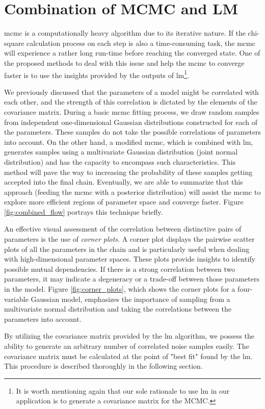 \documentclass[12pt, TexShade, letterpaper]{report}
\begin{document}
\section{Combination of MCMC and LM}
\gls{mcmc} is a computationally heavy algorithm due to its iterative nature. If the chi-square calculation process on each step is also a time-consuming task, the \gls{mcmc} will experience a rather long run-time before reaching the converged state. One of the proposed methods to deal with this issue and help the \gls{mcmc} to converge faster is to use the insights provided by the outputs of \gls{lm}\footnote{It is worth mentioning again that our sole rationale to use \gls{lm} in our application is to generate a covariance matrix for the MCMC.}.\par
We previously discussed that the parameters of a model might be correlated with each other, and the strength of this correlation is dictated by the elements of the covariance matrix. During a basic \gls{mcmc} fitting process, we draw random samples from independent one-dimensional Gaussian distributions constructed for each of the parameters. These samples do not take the possible correlations of parameters into account. On the other hand, a modified \gls{mcmc}, which is combined with \gls{lm}, generates samples using a multivariate Gaussian distribution (joint normal distribution) and has the capacity to encompass such characteristics. This method will pave the way to increasing the probability of these samples getting accepted into the final chain. Eventually, we are able to summarize that this approach (feeding the \gls{mcmc} with a posterior distribution) will assist the \gls{mcmc} to explore more efficient regions of parameter space and converge faster. Figure \ref{fig:combined_flow} portrays this technique briefly.\par
An effective visual assessment of the correlation between distinctive pairs of parameters is the use of \emph{corner plots}. A corner plot displays the pairwise scatter plots of all the parameters in the chain and is particularly useful when dealing with high-dimensional parameter spaces. These plots provide insights to identify possible mutual dependencies. If there is a strong correlation between two parameters, it may indicate a degeneracy or a trade-off between those parameters in the model. Figure \ref{fig:corner_plots}, which shows the corner plots for a four-variable Gaussian model, emphasizes the importance of sampling from a multivariate normal distribution and taking the correlations between the parameters into account.\par
By utilizing the covariance matrix provided by the \gls{lm} algorithm, we possess the ability to generate an arbitrary number of correlated noise samples easily. The covariance matrix must be calculated at the point of "best fit" found by the \gls{lm}. This procedure is described thoroughly in the following section.\par
\end{document}
